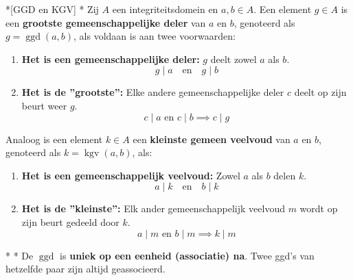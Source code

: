 \begin{nicedefinition}*[GGD en KGV]
    \nextpart[]*
    Zij $A$ een integriteitsdomein en $a, b \in A$. Een element $g \in A$ is een \textcolor{PineGreen!75!black}{\textbf{grootste gemeenschappelijke deler}} van $a$ en $b$, genoteerd als $g = \operatorname{ggd}(a,b)$, als voldaan is aan twee voorwaarden:
    \begin{enumerate}
        \item \textbf{Het is een gemeenschappelijke deler:} $g$ deelt zowel $a$ als $b$.
        \begin{equation*}
            g \mid a \quad \text{en} \quad g \mid b
        \end{equation*}
        \item \textbf{Het is de ''grootste'':} Elke andere gemeenschappelijke deler $c$ deelt op zijn beurt weer $g$.
        \begin{equation*}
            c \mid a \text{ en } c \mid b \implies c \mid g
        \end{equation*}
    \end{enumerate}

    \vspace{0.25cm}

    Analoog is een element $k \in A$ een \textcolor{PineGreen!75!black}{\textbf{kleinste gemeen veelvoud}} van $a$ en $b$, genoteerd als $k = \operatorname{kgv}(a,b)$, als:
    \begin{enumerate}
        \item \textbf{Het is een gemeenschappelijk veelvoud:} Zowel $a$ als $b$ delen $k$.
        \begin{equation*}
            a \mid k \quad \text{en} \quad b \mid k
        \end{equation*}
        \item \textbf{Het is de ''kleinste'':} Elk ander gemeenschappelijk veelvoud $m$ wordt op zijn beurt gedeeld door $k$.
        \begin{equation*}
            a \mid m \text{ en } b \mid m \implies k \mid m
        \end{equation*}
    \end{enumerate}
\end{nicedefinition}

\begin{nicetheorem}*
    \nextpart[]*
    De $\operatorname{ggd}$ is \textbf{uniek op een eenheid (associatie) na}. Twee ggd's van hetzelfde paar zijn altijd geassocieerd.
\end{nicetheorem}

